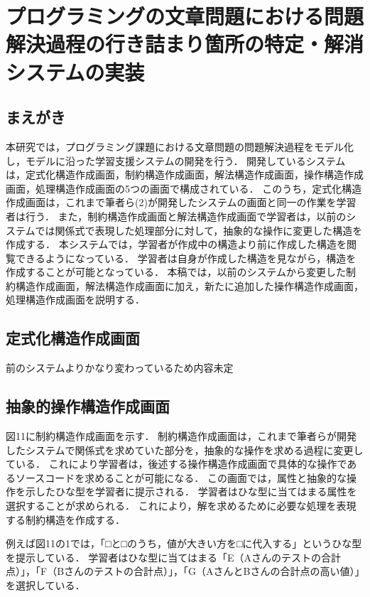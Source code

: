 \chapter{プログラミングの文章問題における問題解決過程の行き詰まり箇所の特定・解消システムの実装}

\section{まえがき}
本研究では，プログラミング課題における文章問題の問題解決過程をモデル化し，モデルに沿った学習支援システムの開発を行う．
開発しているシステムは，定式化構造作成画面，制約構造作成画面，解法構造作成画面，操作構造作成画面，処理構造作成画面の5つの画面で構成されている．
このうち，定式化構造作成画面は，これまで筆者ら(2)が開発したシステムの画面と同一の作業を学習者は行う．
また，制約構造作成画面と解法構造作成画面で学習者は，以前のシステムでは関係式で表現した処理部分に対して，抽象的な操作に変更した構造を作成する．
本システムでは，学習者が作成中の構造より前に作成した構造を閲覧できるようになっている．
学習者は自身が作成した構造を見ながら，構造を作成することが可能となっている．
本稿では，以前のシステムから変更した制約構造作成画面，解法構造作成画面に加え，新たに追加した操作構造作成画面，処理構造作成画面を説明する．

\newpage

\section{定式化構造作成画面}
前のシステムよりかなり変わっているため内容未定

\newpage


\section{抽象的操作構造作成画面}
図11に制約構造作成画面を示す．
制約構造作成画面は，これまで筆者らが開発したシステムで関係式を求めていた部分を，抽象的な操作を求める過程に変更している．
これにより学習者は，後述する操作構造作成画面で具体的な操作であるソースコードを求めることが可能になる．
この画面では，属性と抽象的な操作を示したひな型を学習者に提示される．
学習者はひな型に当てはまる属性を選択することが求められる．
これにより，解を求めるために必要な処理を表現する制約構造を作成する．

例えば図11の1では，「□と□のうち，値が大きい方を□に代入する」というひな型を提示している．
学習者はひな型に当てはまる「E（Aさんのテストの合計点）」，「F（Bさんのテストの合計点）」，「G（AさんとBさんの合計点の高い値）」を選択している．

